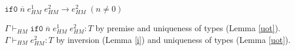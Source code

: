 \begin{case}
$\mathtt{if0}\;\overline{n}\;e_{HM}^{1}\;e_{HM}^{2}\rightarrow e_{HM}^{2}\;(n\neq0)$

$\Gamma\vdash_{HM}\mathtt{if0}\;\overline{n}\;e_{HM}^{1}\;e_{HM}^{2}:T$ by premise and uniqueness of types (Lemma \ref{uot}).  $\Gamma\vdash_{HM}e_{HM}^{2}:T$ by inversion (Lemma \ref{i}) and uniqueness of types (Lemma \ref{uot}).
\end{case}